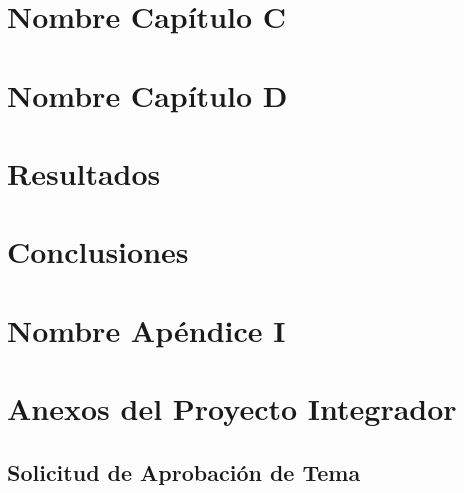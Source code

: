 \documentclass[12pt,A4paper,titlepage, twoside, openright]{report}
\begin{document}
	\chapter{Nombre Capítulo C}
	\label{ch:nombre_capitulo_c}
%	

	\chapter{Nombre Capítulo D}
	\label{ch:nombre_capitulo_d}
%	
	
	\chapter{Resultados}
	\label{ch:resultados}
%	


\chapter{Conclusiones}
\label{ch:conclusiones}
%

\nocite{*}
\printbibliography[heading=bibintoc, title={Bibliografía}]


\appendix
\chapter{Nombre Apéndice I}
\label{app:apendice_I}
%

\chapter{Anexos del Proyecto Integrador}

\section{Solicitud de Aprobación de Tema}


\end{document}
